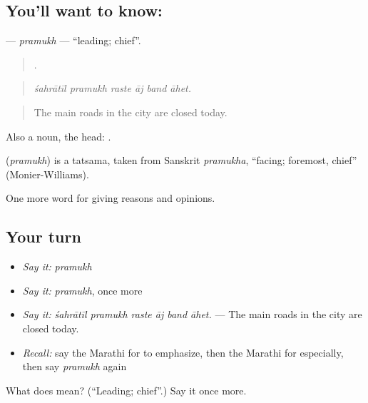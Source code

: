 \subsection*{You'll want to know: }
\textbf{} — \emph{pramukh} — \textquotedblleft{}leading; chief\textquotedblright{}.

\begin{quote}
     .
\end{quote}

\begin{quote}
\emph{śahrātīl pramukh raste āj band āhet.}
\end{quote}

\begin{quote}
The main roads in the city are closed today.
\end{quote}

Also a noun, the head:  .

\begin{cousinweb}
\textbf{} (\emph{pramukh}) is a tatsama, taken from Sanskrit \emph{pramukha}, \textquotedblleft{}facing; foremost, chief\textquotedblright{} (Monier-Williams).
\end{cousinweb}

\begin{grammarlens}[title={What you've built}]
One more word for giving reasons and opinions.
\end{grammarlens}

\subsection*{Your turn}
\begin{itemize}
\raggedright
  \item \emph{Say it:} \emph{pramukh}
  \item \emph{Say it:} \emph{pramukh}, once more
  \item \emph{Say it:} \emph{śahrātīl pramukh raste āj band āhet.} — The main roads in the city are closed today.
  \item \emph{Recall:} say the Marathi for to emphasize, then the Marathi for especially, then say \emph{pramukh} again
\end{itemize}

\begin{tcolorbox}[breakable,colback=teal!4,colframe=teal!35!black,title={Before you move on}]
What does  mean? (\textquotedblleft{}Leading; chief\textquotedblright{}.) Say it once more.
\end{tcolorbox}
